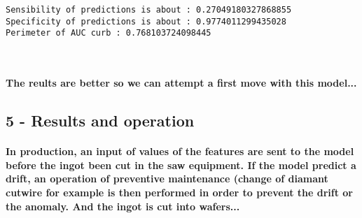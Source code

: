 \documentclass[11pt]{article}
\begin{document}
    \begin{Verbatim}[commandchars=\\\{\}]
Sensibility of predictions is about : 0.27049180327868855
Specificity of predictions is about : 0.9774011299435028
Perimeter of AUC curb : 0.768103724098445

    \end{Verbatim}

    \begin{center}
    \end{center}
    { \hspace*{\fill} \\}
    
    \paragraph{The reults are better so we can attempt a first move with
this
model...}\label{the-reults-are-better-so-we-can-attempt-a-first-move-with-this-model...}

    \subsection{5 - Results and operation}\label{results-and-operation}

    \paragraph{In production, an input of values of the features are sent to
the model before the ingot been cut in the saw equipment. If the model
predict a drift, an operation of preventive maintenance (change of
diamant cutwire for example is then performed in order to prevent the
drift or the anomaly. And the ingot is cut into
wafers...}\label{in-production-an-input-of-values-of-the-features-are-sent-to-the-model-before-the-ingot-been-cut-in-the-saw-equipment.-if-the-model-predict-a-drift-an-operation-of-preventive-maintenance-change-of-diamant-cutwire-for-example-is-then-performed-in-order-to-prevent-the-drift-or-the-anomaly.-and-the-ingot-is-cut-into-wafers...}
\end{document}

